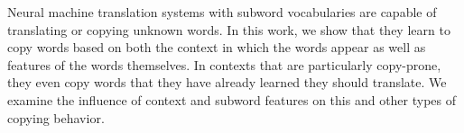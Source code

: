 Neural machine translation systems with subword vocabularies are capable of translating or copying unknown words. In this work, we show that they learn to copy words based on both the context in which the words appear as well as features of the words themselves. In contexts that are particularly copy-prone, they even copy words that they have already learned they should translate. We examine the influence of context and subword features on this and other types of copying behavior.
